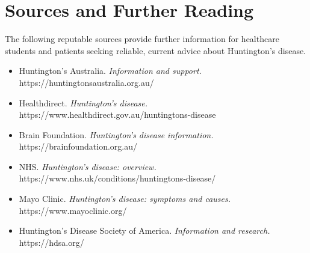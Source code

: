 \section*{Sources and Further Reading}
The following reputable sources provide further information for healthcare students and patients seeking reliable, current advice about Huntington's disease.

\begin{itemize}
    \item Huntington's Australia. \textit{Information and support.} https://huntingtonsaustralia.org.au/
    \item Healthdirect. \textit{Huntington's disease.} https://www.healthdirect.gov.au/huntingtons-disease
    \item Brain Foundation. \textit{Huntington's disease information.} https://brainfoundation.org.au/
    \item NHS. \textit{Huntington's disease: overview.} https://www.nhs.uk/conditions/huntingtons-disease/
    \item Mayo Clinic. \textit{Huntington's disease: symptoms and causes.} https://www.mayoclinic.org/
    \item Huntington's Disease Society of America. \textit{Information and research.} https://hdsa.org/
\end{itemize}

